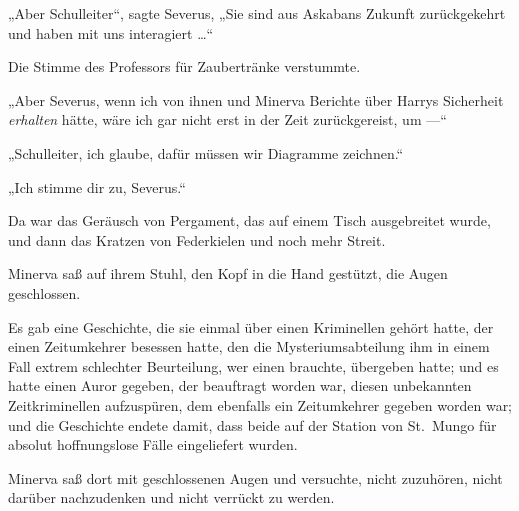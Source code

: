„Aber Schulleiter“, sagte Severus,
„Sie sind aus Askabans Zukunft zurückgekehrt und haben mit uns interagiert …“

Die Stimme des Professors für Zaubertränke verstummte.

„Aber Severus, wenn ich von ihnen und Minerva Berichte über Harrys Sicherheit \emph{erhalten} hätte, wäre ich gar nicht erst in der Zeit zurückgereist, um —“

„Schulleiter, ich glaube, dafür müssen wir Diagramme zeichnen.“

„Ich stimme dir zu, Severus.“

Da war das Geräusch von Pergament, das auf einem Tisch ausgebreitet wurde, und dann das Kratzen von Federkielen und noch mehr Streit.

Minerva saß auf ihrem Stuhl, den Kopf in die Hand gestützt, die Augen geschlossen.

Es gab eine Geschichte, die sie einmal über einen Kriminellen gehört hatte, der einen Zeitumkehrer besessen hatte, den die Mysteriumsabteilung ihm in einem Fall extrem schlechter Beurteilung, wer einen brauchte, übergeben hatte; und es hatte einen Auror gegeben, der beauftragt worden war, diesen unbekannten Zeitkriminellen aufzuspüren, dem ebenfalls ein Zeitumkehrer gegeben worden war; und die Geschichte endete damit, dass beide auf der Station von St.~Mungo für absolut hoffnungslose Fälle eingeliefert wurden.

Minerva saß dort mit geschlossenen Augen und versuchte, nicht zuzuhören, nicht darüber nachzudenken und nicht verrückt zu werden.

